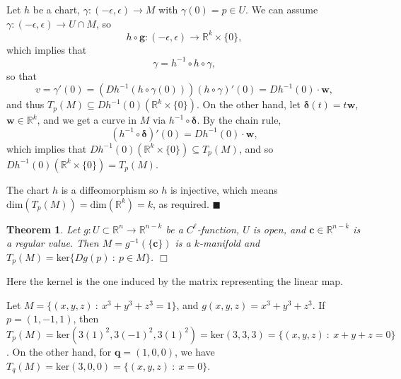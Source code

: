 \documentclass[letter-paper]{tufte-book}
\newtheorem{theorem}{\color{pastel-blue}Theorem}[section]
\newenvironment{proof}[1][Proof]{\begin{trivlist}
\item[\hskip \labelsep {\bfseries #1}]}{\end{trivlist}}
\newenvironment{example}[1][Example]{\begin{trivlist}
\item[\hskip \labelsep {\bfseries #1}]}{\end{trivlist}}
\newcommand{\qed}{\hfill$\blacksquare$}
\newcommand{\qedwhite}{\hfill \ensuremath{\Box}}
\begin{document}
\begin{proof}
  Let $h$ be a chart, $\gamma : (-\epsilon, \epsilon) \to M$ with
  $\gamma(0) = p \in U$. We can assume
  $\gamma : (-\epsilon, \epsilon) \to U \cap M$, so
  \begin{equation*}
    h \circ \boldsymbol{g} : (-\epsilon, \epsilon) \to \mathbb{R}^k \times \{0\},
  \end{equation*}
  which implies that
  \begin{equation*}
    \gamma = h^{-1} \circ h \circ \gamma,
  \end{equation*}
  so that
  \begin{equation*}
    v = \gamma'(0) = (Dh^{-1}(h\circ \gamma(0)))(h \circ \gamma)'(0) = Dh^{-1}(0) \cdot \boldsymbol{w},
  \end{equation*}
  and thus $T_p(M) \subseteq Dh^{-1}(0)(\mathbb{R}^k \times \{0\})$. On the
  other hand, let $\boldsymbol{\delta}(t) = t\boldsymbol{w}$, $\boldsymbol{w}
  \in \mathbb{R}^k$, and we get a curve in $M$ via $h^{-1} \circ
  \boldsymbol{\delta}$. By the chain rule,
  \begin{equation*}
    (h^{-1} \circ \boldsymbol{\delta})'(0) = Dh^{-1}(0) \cdot \boldsymbol{w},
  \end{equation*}
  which implies that $Dh^{-1}(0)(\mathbb{R}^k \times \{0\}) \subseteq T_p(M)$,
  and so $Dh^{-1}(0)(\mathbb{R}^k \times \{0\}) = T_p(M)$.
  
  The chart $h$ is a diffeomorphism so $h$ is injective, which means
  $\mbox{dim}(T_p(M)) = \mbox{dim}(\mathbb{R}^k) = k$, as required. \qed
\end{proof}

\begin{theorem}
  Let $g : U \subset \mathbb{R}^n \to \mathbb{R}^{n-k}$ be a $C^\ell$-function,
  $U$ is open, and $\boldsymbol{c} \in \mathbb{R}^{n-k}$ is a regular value.
  Then $M = g^{-1}(\{\boldsymbol{c}\})$ is a $k$-manifold and $T_p(M) =
  \mbox{ker}\{ Dg(p)\ : \ p\in M\}$. \qedwhite
\end{theorem}

Here the kernel is the one induced by the matrix representing the linear map.

\begin{example}
  Let $M = \{(x,y,z)\ : \ x^3 + y^3 + z^3 = 1\}$, and $g(x,y,z) = x^3 + y^3 +
  z^3$. If $p = (1, -1, 1)$, then $T_p(M) = \mbox{ker}(3(1)^2,
  3(-1)^2, 3(1)^2) = \mbox{ker}(3, 3, 3) = \{(x,y,z)\ : \ x + y + z = 0\}$. On
  the other hand, for $\boldsymbol{q} = (1,0,0)$, we have $T_q(M) =
  \mbox{ker}(3, 0, 0) = \{(x,y,z)\ : \ x = 0\}$.
\end{example}
\end{document}
